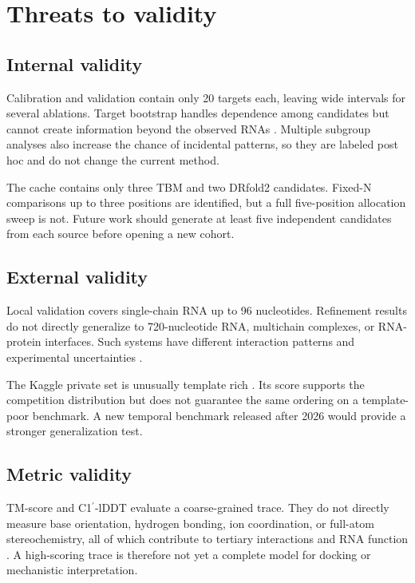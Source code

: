 \documentclass[12pt,a4paper,oneside]{report}
\newcommand{\cprime}{C1$^{\prime}$}
\begin{document}
\section{Threats to validity}

\subsection{Internal validity}

Calibration and validation contain only 20 targets each, leaving wide intervals for
several ablations. Target bootstrap handles dependence among candidates but cannot create
information beyond the observed RNAs \cite{bootstrap}. Multiple subgroup analyses also
increase the chance of incidental patterns, so they are labeled post hoc and do not
change the current method.

The cache contains only three TBM and two DRfold2 candidates. Fixed-N comparisons up to
three positions are identified, but a full five-position allocation sweep is not. Future
work should generate at least five independent candidates from each source before
opening a new cohort.

\subsection{External validity}

Local validation covers single-chain RNA up to 96 nucleotides. Refinement results do not
directly generalize to 720-nucleotide RNA, multichain complexes, or RNA-protein interfaces.
Such systems have different interaction patterns and experimental uncertainties
\cite{zhang_experimental_review,ma_cryoem}.

The Kaggle private set is unusually template rich \cite{competition_paper}. Its score
supports the competition distribution but does not guarantee the same ordering on a
template-poor benchmark. A new temporal benchmark released after 2026 would provide a
stronger generalization test.

\subsection{Metric validity}

TM-score and \cprime{}-lDDT evaluate a coarse-grained trace. They do not directly measure
base orientation, hydrogen bonding, ion coordination, or full-atom stereochemistry,
all of which contribute to tertiary interactions and RNA function
\cite{butcher_tertiary,cao_rna_functions}. A high-scoring trace is therefore not yet a
complete model for docking or mechanistic interpretation.
\end{document}
